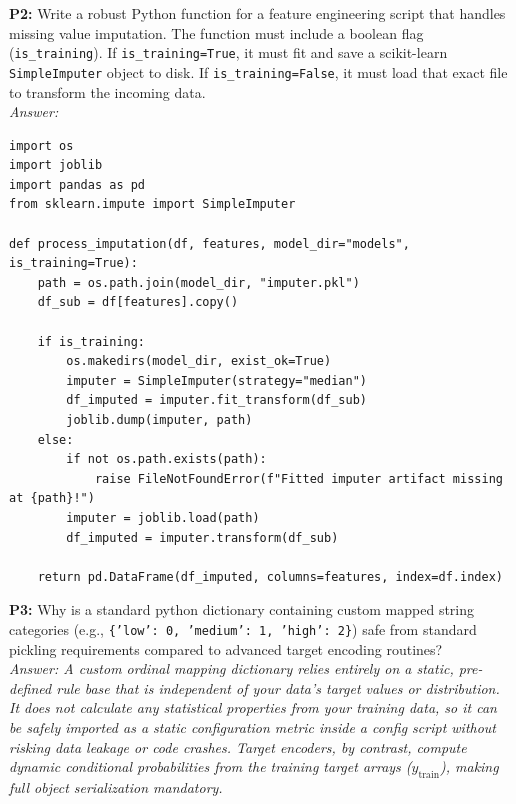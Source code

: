 \documentclass{article}
\begin{document}
\newline
\textbf{P2:} Write a robust Python function for a feature engineering script that handles missing value imputation. The function must include a boolean flag (\texttt{is\_training}). If \texttt{is\_training=True}, it must fit and save a scikit-learn \texttt{SimpleImputer} object to disk. If \texttt{is\_training=False}, it must load that exact file to transform the incoming data.
\\
\textit{Answer:}
\begin{verbatim}
import os
import joblib
import pandas as pd
from sklearn.impute import SimpleImputer

def process_imputation(df, features, model_dir="models", is_training=True):
    path = os.path.join(model_dir, "imputer.pkl")
    df_sub = df[features].copy()

    if is_training:
        os.makedirs(model_dir, exist_ok=True)
        imputer = SimpleImputer(strategy="median")
        df_imputed = imputer.fit_transform(df_sub)
        joblib.dump(imputer, path)
    else:
        if not os.path.exists(path):
            raise FileNotFoundError(f"Fitted imputer artifact missing at {path}!")
        imputer = joblib.load(path)
        df_imputed = imputer.transform(df_sub)

    return pd.DataFrame(df_imputed, columns=features, index=df.index)
\end{verbatim}

\newline
\textbf{P3:} Why is a standard python dictionary containing custom mapped string categories (e.g., \texttt{\{'low': 0, 'medium': 1, 'high': 2\}}) safe from standard pickling requirements compared to advanced target encoding routines?
\\
\textit{Answer: A custom ordinal mapping dictionary relies entirely on a static, pre-defined rule base that is independent of your data's target values or distribution. It does not calculate any statistical properties from your training data, so it can be safely imported as a static configuration metric inside a config script without risking data leakage or code crashes. Target encoders, by contrast, compute dynamic conditional probabilities from the training target arrays ($y_{\text{train}}$), making full object serialization mandatory.}
\end{document}
